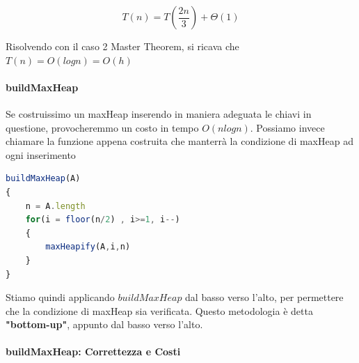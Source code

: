 \documentclass{article}
\begin{document}
\begin{equation}
    T(n)=T(\frac{2n}{3})+\Theta(1)
\end{equation}

Risolvendo con il caso 2 Master Theorem, si ricava che $T(n)= O(logn) = O(h)$

\paragraph{buildMaxHeap} Se costruissimo un maxHeap inserendo in maniera adeguata le chiavi in questione, provocheremmo un costo in tempo $O(nlogn)$. Possiamo invece chiamare la funzione appena costruita che manterrà la condizione di maxHeap ad ogni inserimento

\begin{lstlisting}[language=JavaScript]
buildMaxHeap(A)
{
    n = A.length
    for(i = floor(n/2) , i>=1, i--)
    {
        maxHeapify(A,i,n)
    }
}
\end{lstlisting}

Stiamo quindi applicando $buildMaxHeap$ dal basso verso l'alto, per permettere che la condizione di maxHeap sia verificata. Questo metodologia è detta \textbf{"bottom-up"}, appunto dal basso verso l'alto.

\newpage

\paragraph{buildMaxHeap: Correttezza e Costi}
\end{document}
